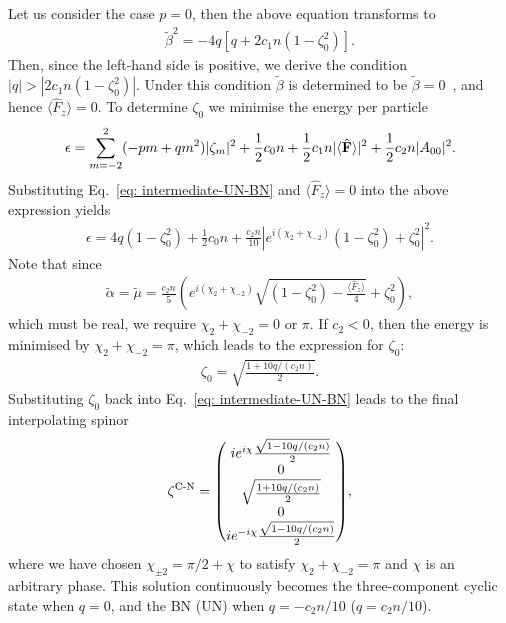 Let us consider the case \(p=0\), then the above equation transforms to
\begin{align}
    \tilde{\beta}^2 = -4q\left[q + 2c_1n(1-\zeta_0^2)\right].
\end{align}
Then, since the left-hand side is positive, we derive the condition
\(|q| > |2c_1n(1-\zeta_0^2)|\).
Under this condition \(\tilde{\beta}\) is determined to be
\(\tilde{\beta}=0\)~\cite{Kawaguchi2012}, and hence \(\langle\hat{F}_z\rangle
=0\).
To determine \(\zeta_0\) we minimise the energy per
particle~\cite{Kawaguchi2012}
\begin{align}
    \epsilon = \sum_{m=-2}^{2}(-pm+qm^2)|\zeta_m|^2 + \frac{1}{2}c_0n
    + \frac{1}{2}c_1n|\langle \hat{\vb{F}} \rangle |^2 + \frac{1}{2}c_2n|A_{00}|^2.
\end{align}
Substituting Eq.~\eqref{eq: intermediate-UN-BN} and
\(\langle\hat{F}_z\rangle=0\) into the above expression yields
\begin{align}
    \epsilon = 4q(1-\zeta_0^2) + \frac{1}{2}c_0n + \frac{c_2n}{10}\left|
        e^{i(\chi_2+\chi_{-2})}(1-\zeta_0^2) + \zeta_0^2
    \right|^2.
\end{align}
Note that since
\begin{align}
    \tilde{\alpha}=\tilde{\mu}=\frac{c_2n}{5}\left(
        e^{i(\chi_2+\chi_{-2})}\sqrt{(1-\zeta_0^2)
        -\frac{\langle\hat{F}_z\rangle}{4}}
        + \zeta_0^2\right),
\end{align}
which must be real, we require \(\chi_2 + \chi_{-2} = 0\) or \(\pi\).
If \(c_2 < 0\), then the energy is minimised by \(\chi_2+\chi_{-2}=\pi\), which
leads to the expression for \(\zeta_0\):
\begin{align}
    \zeta_0 = \sqrt{\frac{1 + 10q/(c_2n)}{2}}.    
\end{align}
Substituting \(\zeta_0\) back into Eq.~\eqref{eq: intermediate-UN-BN} leads to
the final interpolating spinor
\begin{align}
    \zeta^\text{C-N} = \mqty(
        ie^{i\chi}\frac{\sqrt{1 - 10q/(c_2n)}}{2} \\
        0 \\
        \sqrt{\frac{1 + 10q/(c_2n)}{2}} \\
        0 \\
        ie^{-i\chi}\frac{\sqrt{1 - 10q/(c_2n)}}{2}
    ),
\end{align}
where we have chosen \(\chi_{\pm 2} = \pi/2 + \chi\) to satisfy
\(\chi_2+\chi_{-2} = \pi\) and \(\chi\) is an arbitrary phase.
This solution continuously becomes the three-component cyclic state when
\(q = 0\), and the BN (UN) when \(q = -c_2n/10\) (\(q = c_2n/10\)).

